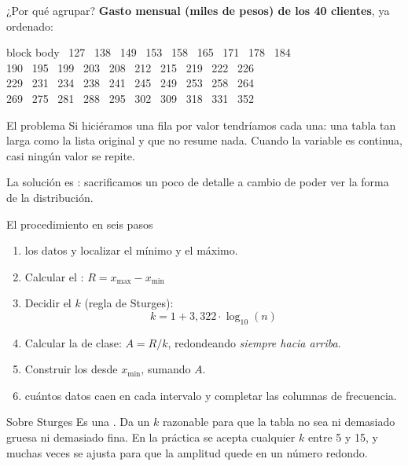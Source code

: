 \documentclass[aspectratio=169,10pt]{beamer}
\begin{document}

\begin{frame}{¿Por qué agrupar?}
  \footnotesize
  \textbf{Gasto mensual (miles de pesos) de los 40 clientes}, ya ordenado:

  \vspace{0.15cm}
  \begin{beamercolorbox}[wd=\textwidth,sep=0.12cm]{block body}
    \centering\scriptsize{} \ 127 \ 138 \ 149 \ 153 \ 158 \ 165 \ 171 \ 178 \ 184 \\
    190 \ 195 \ 199 \ 203 \ 208 \ 212 \ 215 \ 219 \ 222 \ 226 \\
    229 \ 231 \ 234 \ 238 \ 241 \ 245 \ 249 \ 253 \ 258 \ 264 \\
    269 \ 275 \ 281 \ 288 \ 295 \ 302 \ 309 \ 318 \ 331 \ 352
  \end{beamercolorbox}

  \vspace{0.25cm}
  \begin{alertblock}{El problema}
    \footnotesize
    Si hiciéramos una fila por valor tendríamos  cada una: una tabla tan larga como la lista original y que no
    resume nada. Cuando la variable es continua, casi ningún valor se repite.
  \end{alertblock}

  \vspace{0.15cm}
  {\footnotesize\color{uniGris} La solución es : sacrificamos un poco de detalle a cambio de poder ver la forma de la
  distribución.}
\end{frame}

\begin{frame}{El procedimiento en seis pasos}
  \footnotesize
  \begin{enumerate}\setlength{\itemsep}{0.12cm}
    \item {} los datos y localizar el mínimo y el máximo.
    \item Calcular el : \quad $R = x_{\max} - x_{\min}$
    \item Decidir el  $k$ (regla de Sturges):
      \[ k = 1 + 3{,}322 \cdot \log_{10}(n) \]
    \item Calcular la  de clase: \quad $A = R / k$,
      redondeando \emph{siempre hacia arriba}.
    \item Construir los  desde $x_{\min}$, sumando $A$.
    \item {} cuántos datos caen en cada intervalo y completar las
      columnas de frecuencia.
  \end{enumerate}

  \vspace{0.2cm}
  \begin{alertblock}{Sobre Sturges}
    \scriptsize
    Es una . Da un $k$ razonable para que la tabla
    no sea ni demasiado gruesa ni demasiado fina. En la práctica se acepta
    cualquier $k$ entre 5 y 15, y muchas veces se ajusta para que la amplitud
    quede en un número redondo.
  \end{alertblock}
\end{frame}
\end{document}
